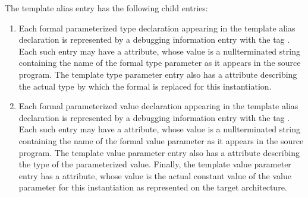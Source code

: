 The template alias entry has the following child entries:
\begin{enumerate}[1. ]
\item Each formal parameterized type declaration appearing
in the template alias declaration is represented
by a debugging information entry with the tag
. 
Each such entry may have
a  attribute,
whose value is a null\dash terminated
string containing the name of the formal type parameter as it
appears in the source program. The template type parameter
entry also has 
a  attribute
describing the actual
type by which the formal is replaced for this instantiation.

\item Each formal parameterized value declaration
appearing in the template alias declaration is
represented by a debugging information entry with the tag
. 
Each such entry may have
a  attribute,
whose value is a null\dash terminated
string containing the name of the formal value parameter
as it appears in the source program. The template value
parameter entry also has 
a  attribute describing
the type of the parameterized value. Finally, the template
value parameter entry has a  
attribute, whose value is the actual constant value of the value parameter for
this instantiation as represented on the target architecture.
\end{enumerate}

